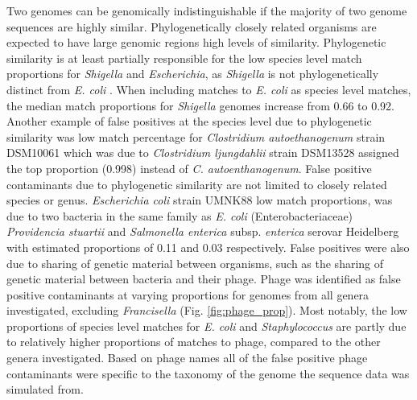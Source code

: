\documentclass[fleqn,10pt,lineno]{wlpeerj}\usepackage[]{graphicx}\usepackage[]{color}
\begin{document}
Two genomes can be genomically indistinguishable if the majority of two genome sequences are highly similar.
Phylogenetically closely related organisms are expected to have large genomic regions high levels of similarity. 
Phylogenetic similarity is at least partially responsible for the low species level match proportions for  \textit{Shigella} and \textit{Escherichia}, as \textit{Shigella} is not phylogenetically distinct from \textit{E. coli} \citep{lan2002escherichia}.
When including matches to \textit{E. coli} as species level matches, the median match proportions for \textit{Shigella} genomes increase from 0.66 to 0.92. 
Another example of false positives at the species level due to phylogenetic similarity was low match percentage for \textit{Clostridium autoethanogenum} strain DSM10061 which was due to  \textit{Clostridium ljungdahlii} strain DSM13528 assigned the top proportion (0.998) instead of \textit{C. autoenthanogenum}. 
False positive contaminants due to phylogenetic similarity are not limited to closely related species or genus.
\textit{Escherichia coli} strain UMNK88 low match proportions, was due to two bacteria in the same family as \textit{E. coli} 
(Enterobacteriaceae) \textit{Providencia stuartii} and \textit{Salmonella enterica} subsp. \textit{enterica} serovar Heidelberg with estimated proportions of 0.11 and 0.03 respectively. 
False positives were also due to sharing of genetic material between organisms, such as the sharing of genetic material between bacteria and their phage. 
Phage was identified as false positive contaminants at varying proportions for genomes from all genera investigated, excluding \textit{Francisella} (Fig. \ref{fig:phage_prop}). 
Most notably, the low proportions of species level matches for \textit{E. coli} and \textit{Staphylococcus} are partly due to relatively higher proportions of matches to phage, compared to the other genera investigated. 
Based on phage names all of the false positive phage contaminants were specific to the taxonomy of the genome the sequence data was simulated from.  



\end{document}
